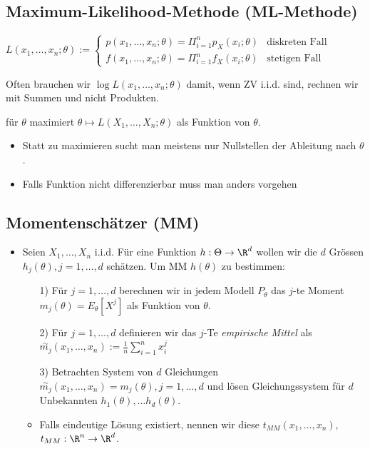 \subsection{Maximum-Likelihood-Methode (ML-Methode)}
\begin{itemize}
     $L(x_1, \dots, x_n; \theta) :=
\begin{cases}
    p(x_1, \dots, x_n; \theta) = \Pi_{i = 1}^n p_X(x_i; \theta) &\text{diskreten Fall}\\
    f(x_1, \dots, x_n; \theta) = \Pi_{i = 1}^n f_X(x_i; \theta) &\text{stetigen Fall}
\end{cases}$
        \begin{itemize}
             Often brauchen wir $\log L(x_1, \dots, x_n;\theta)$ damit, wenn ZV i.i.d. sind, rechnen wir mit Summen und nicht Produkten.
        \end{itemize}
         für $\theta$ maximiert $\theta \mapsto L(X_1, \dots, X_n;\theta)$ als Funktion von $\theta$.
        \begin{itemize}
            \item Statt zu maximieren sucht man meistens nur Nullstellen der Ableitung nach $\theta$.
            \item Falls Funktion nicht differenzierbar muss man anders vorgehen
        \end{itemize}
\end{itemize}

\subsection{Momentenschätzer (MM)}
\begin{itemize}
    \item Seien $X_1, \dots, X_n$ i.i.d. Für eine Funktion $h: \Theta \to \R^d$ wollen wir die $d$ Grössen $h_j(\theta), j = 1, \dots, d$ schätzen. Um MM $h(\theta)$ zu bestimmen:
    \begin{itemize}
        \item[1)] Für $j = 1, \dots, d$ berechnen wir in jedem Modell $P_\theta$ das $j$-te Moment $m_j(\theta) = E_\theta[X^j]$ als Funktion von $\theta$.
        \item[2)] Für $j = 1, \dots, d$ definieren wir das $j$-Te \textit{empirische Mittel} als $\overset{\sim}{m_j}(x_1, \dots, x_n) := \frac{1}{n} \sum_{i=1}^{n} x_i^j$
        \item[3)] Betrachten System von $d$ Gleichungen $\overset{\sim}{m_j}(x_1, \dots, x_n) = m_j(\theta), j = 1, \dots, d$ und lösen Gleichungssystem für $d$ Unbekannten $h_1(\theta), \dots h_d(\theta)$.
        \item Falls eindeutige Lösung existiert, nennen wir diese $t_{MM}(x_1, \dots, x_n)$, $t_{MM}: \R^n \to \R^d$.
    \end{itemize}
\end{itemize}

